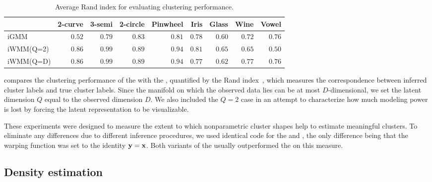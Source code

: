 \begin{table}[ht!]
\centering
\caption[Clustering performance comparison]
{Average Rand index for evaluating clustering performance.}
\label{tab:rand}
\begin{tabular}{lrrrrrrrr}
\hline
 & 2-curve & 3-semi & 2-circle & Pinwheel & Iris  & Glass  & Wine  & Vowel  \\
\hline
iGMM & $0.52$ & $0.79$ & $0.83$ & $0.81$ & $0.78$ & $0.60$ & $0.72$ & $\mathbf{0.76}$ \\
iWMM(Q=2) & $\mathbf{0.86}$ & $\mathbf{0.99}$ & $\mathbf{0.89}$ & $\mathbf{0.94}$ & $\mathbf{0.81}$ & $\mathbf{0.65}$ & $0.65$ & $0.50$ \\
iWMM(Q=D) & $\mathbf{0.86}$ & $\mathbf{0.99}$ & $\mathbf{0.89}$ & $\mathbf{0.94}$ & $0.77$ & $0.62$ & $\mathbf{0.77}$ & $\mathbf{0.76}$ \\
\hline
\end{tabular}
\end{table}
%
 compares the clustering performance of the \iwmm{} with the \iGMM{}, quantified by the Rand index~\citep{rand1971objective}, which measures the correspondence between inferred cluster labels and true cluster labels.
Since the manifold on which the observed data lies can be at most $D$-dimensional, we set the latent dimension $Q$ equal to the observed dimension $D$.
We also included the $Q = 2$ case in an attempt to characterize how much modeling power is lost by forcing the latent representation to be visualizable. 

These experiments were designed to measure the extent to which nonparametric cluster shapes help to estimate meaningful clusters.
To eliminate any differences due to different inference procedures, we used identical code for the \iGMM{} and \iwmm{}, the only difference being that the warping function was set to the identity ${\bf{y}} = {\bf{x}}$.
Both variants of the \iwmm{} usually outperformed the \iGMM{} on this measure.


\subsection{Density estimation}

